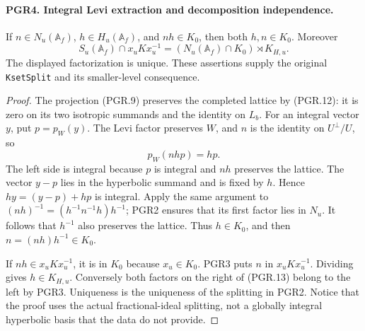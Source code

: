 \paragraph{PGR4. Integral Levi extraction and decomposition independence.}
\label{claim:PGR4}
If \(n\in N_u(\mathbb A_f)\), \(h\in H_u(\mathbb A_f)\),
and \(nh\in K_0\), then both \(h,n\in K_0\).
Moreover
\[
 S_u(\mathbb A_f)\cap x_uKx_u^{-1}
   =(N_u(\mathbb A_f)\cap K_0)\rtimes K_{H,u}.
\tag{PGR.13}
\]
The displayed factorization is unique.  These assertions supply the
original \texttt{KsetSplit} and its smaller-level consequence.
\begin{proof}
The projection (PGR.9) preserves the completed lattice by (PGR.12):
it is zero on its two isotropic summands and the identity on \(L_b\).
For an integral vector \(y\), put \(p=p_W(y)\).  The Levi
factor preserves \(W\), and \(n\) is the identity on
\(U^\perp/U\), so
\[
                  p_W(nhp)=hp.
\]
The left side is integral because \(p\) is integral and \(nh\)
preserves the lattice.  The vector \(y-p\) lies in the hyperbolic
summand and is fixed by \(h\).  Hence
\(hy=(y-p)+hp\) is integral.  Apply the same argument to
\((nh)^{-1}=(h^{-1}n^{-1}h)h^{-1}\); PGR2 ensures that
its first factor lies in \(N_u\).  It follows that \(h^{-1}\)
also preserves the lattice.  Thus \(h\in K_0\), and then
\(n=(nh)h^{-1}\in K_0\).

If \(nh\in x_uKx_u^{-1}\), it is in \(K_0\) because
\(x_u\in K_0\).  PGR3 puts \(n\) in \(x_uKx_u^{-1}\).
Dividing gives \(h\in K_{H,u}\).  Conversely both factors on
the right of (PGR.13) belong to the left by PGR3.  Uniqueness is
the uniqueness of the splitting in PGR2.  Notice that the proof uses
the actual fractional-ideal splitting, not a globally integral
hyperbolic basis that the data do not provide.
\end{proof}


